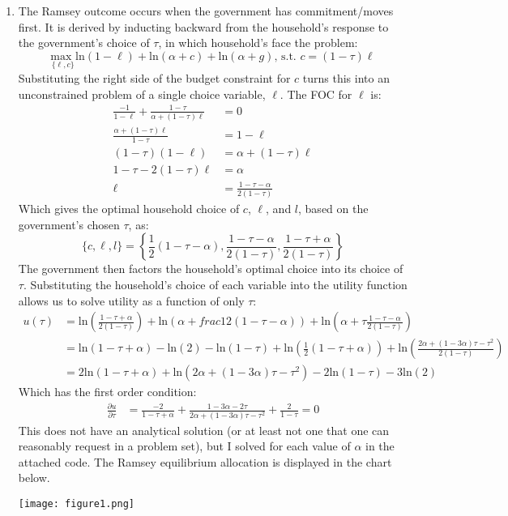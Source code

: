 \documentclass{article}
\newcommand{\loge}[1]{\text{ln}\left(#1\right)}
\newcommand{\usmax}[1]{\underset{\{#1\}}{\text{max }}}
\begin{document}
\begin{enumerate}
	\item The Ramsey outcome occurs when the government has commitment/moves first. It is derived by inducting backward from the household's response to the government's choice of $\tau$, in which household's face the problem:
		\[
			\usmax{\ell,c}\loge{1-\ell} + \loge{\alpha + c} + \loge{\alpha + g}\text{, s.t. }c=(1-\tau)\ell
		\]
		Substituting the right side of the budget constraint for $c$ turns this into an unconstrained problem of a single choice variable, $\ell$. The FOC for $\ell$ is:
		\begin{align*}
			\frac{-1}{1-\ell} + \frac{1-\tau}{\alpha + (1-\tau)\ell}  &= 0	\\
			\frac{\alpha + (1-\tau)\ell}{1-\tau}&= 1-\ell  \\
			(1-\tau)(1-\ell) &= \alpha + (1-\tau)\ell \\
			1-\tau-2(1-\tau)\ell &= \alpha \\
			\ell &= \frac{1-\tau-\alpha}{2(1-\tau)}
		\end{align*}
		Which gives the optimal household choice of $c$, $\ell$, and $l$, based on the government's chosen $\tau$, as:
		\[
			\{c,\ell,l\} = \left\{\frac{1}{2}\left(1-\tau-\alpha\right),\frac{1-\tau-\alpha}{2(1-\tau)},\frac{1-\tau+\alpha}{2(1-\tau)} \right\}
		\]
		The government then factors the household's optimal choice into its choice of $\tau$. Substituting the household's choice of each variable into the utility function allows us to solve utility as a function of only $\tau$:
		\begin{align*}
			u(\tau) &= \loge{\frac{1-\tau+\alpha}{2(1-\tau)} } + \loge{\alpha + frac{1}{2}\left(1-\tau-\alpha\right)} + \loge{\alpha + \tau\frac{1-\tau-\alpha}{2(1-\tau)}} \\
					&= \loge{1-\tau+\alpha} - \loge{2} - \loge{1-\tau} + \loge{\frac{1}{2}(1-\tau+\alpha)} +
					   \loge{\frac{2\alpha + (1-3\alpha)\tau-\tau^2}{2(1-\tau)}} \\
					&= 2\loge{1-\tau+\alpha} + \loge{2\alpha + (1-3\alpha)\tau-\tau^2} - 2\loge{1-\tau} - 3\loge{2}
		\end{align*}
		Which has the first order condition:
		\begin{align*}
			\frac{\partial u}{\partial\tau} &= \frac{-2}{1-\tau+\alpha} + \frac{1-3\alpha - 2\tau}{2\alpha + (1-3\alpha)\tau-\tau^2} + \frac{2}{1-\tau} = 0
		\end{align*}
		This does not have an analytical solution (or at least not one that one can reasonably request in a problem set), but I solved for each value of $\alpha$ in the attached code. The Ramsey equilibrium allocation is displayed in the chart below.
		\begin{center}
			\texttt{[image: figure1.png]}
		\end{center}
		

\end{enumerate}
\end{document}

